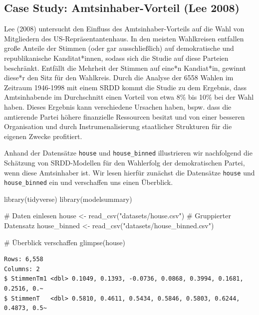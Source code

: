 \documentclass[
  a4paper,
  DIV=11,
  oneside]{scrreprt}
\newenvironment{Shaded}{\begin{snugshade}}{\end{snugshade}}
\newcommand{\CommentTok}[1]{\textcolor[rgb]{0.37,0.37,0.37}{#1}}
\newcommand{\FunctionTok}[1]{\textcolor[rgb]{0.28,0.35,0.67}{#1}}
\newcommand{\NormalTok}[1]{\textcolor[rgb]{0.00,0.23,0.31}{#1}}
\newcommand{\OtherTok}[1]{\textcolor[rgb]{0.00,0.23,0.31}{#1}}
\newcommand{\StringTok}[1]{\textcolor[rgb]{0.13,0.47,0.30}{#1}}
\begin{document}
\hypertarget{case-study-amtsinhaber-vorteil-lee2008}{%
\subsection{Case Study: Amtsinhaber-Vorteil (Lee
2008)}\label{case-study-amtsinhaber-vorteil-lee2008}}

Lee (2008) untersucht den Einfluss des Amtsinhaber-Vorteils auf die Wahl
von Mitgliedern des US-Repräsentantenhaus. In den meisten Wahlkreisen
entfallen große Anteile der Stimmen (oder gar ausschließlich) auf
demokratische und republikanische Kanditat*innen, sodass sich die Studie
auf diese Parteien beschränkt. Entfällt die Mehrheit der Stimmen auf
eine*n Kandiat*in, gewinnt diese*r den Sitz für den Wahlkreis. Durch die
Analyse der 6558 Wahlen im Zeitraum 1946-1998 mit einem SRDD kommt die
Studie zu dem Ergebnis, dass Amtsinhabende im Durchschnitt einen Vorteil
von etwa 8\% bis 10\% bei der Wahl haben. Dieses Ergebnis kann
verschiedene Ursachen haben, bspw. dass die amtierende Partei höhere
finanzielle Ressourcen besitzt und von einer besseren Organisation und
durch Instrumenalisierung staatlicher Strukturen für die eigenen Zwecke
profitiert.

Anhand der Datensätze \texttt{house} und \texttt{house\_binned}
illustrieren wir nachfolgend die Schätzung von SRDD-Modellen für den
Wahlerfolg der demokratischen Partei, wenn diese Amtsinhaber ist. Wir
lesen hierfür zunächst die Datensätze \texttt{house} und
\texttt{house\_binned} ein und verschaffen uns einen Überblick.

\begin{Shaded}
\begin{Highlighting}[]
\FunctionTok{library}\NormalTok{(tidyverse)}
\FunctionTok{library}\NormalTok{(modelsummary)}

\CommentTok{\# Daten einlesen}
\NormalTok{house }\OtherTok{\textless{}{-}} \FunctionTok{read\_csv}\NormalTok{(}\StringTok{"datasets/house.csv"}\NormalTok{)}
\CommentTok{\# Gruppierter Datensatz}
\NormalTok{house\_binned }\OtherTok{\textless{}{-}} \FunctionTok{read\_csv}\NormalTok{(}\StringTok{"datasets/house\_binned.csv"}\NormalTok{)}

\CommentTok{\# Überblick verschaffen}
\FunctionTok{glimpse}\NormalTok{(house)}
\end{Highlighting}
\end{Shaded}

\begin{verbatim}
Rows: 6,558
Columns: 2
$ StimmenTm1 <dbl> 0.1049, 0.1393, -0.0736, 0.0868, 0.3994, 0.1681, 0.2516, 0.~
$ StimmenT   <dbl> 0.5810, 0.4611, 0.5434, 0.5846, 0.5803, 0.6244, 0.4873, 0.5~
\end{verbatim}
\end{document}

